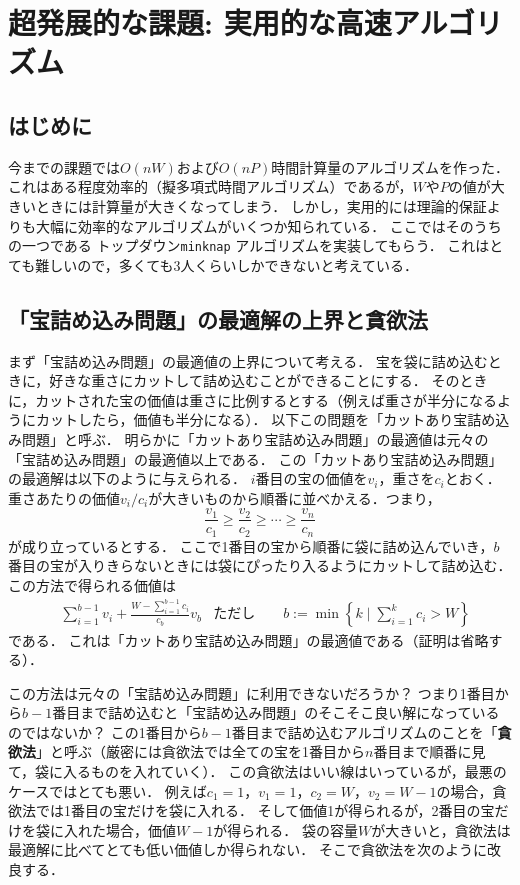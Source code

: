 \documentclass[a4paper,twoside,onecolumn,openany,article]{memoir}
\theoremstyle{remark}
\begin{document}
\section{超発展的な課題: 実用的な高速アルゴリズム}
\subsection{はじめに}
今までの課題では$O(nW)$および$O(nP)$時間計算量のアルゴリズムを作った．
これはある程度効率的（擬多項式時間アルゴリズム）であるが，$W$や$P$の値が大きいときには計算量が大きくなってしまう．
しかし，実用的には理論的保証よりも大幅に効率的なアルゴリズムがいくつか知られている．
ここではそのうちの一つである トップダウン\texttt{minknap} アルゴリズムを実装してもらう．
これはとても難しいので，多くても3人くらいしかできないと考えている．

\subsection{「宝詰め込み問題」の最適解の上界と貪欲法}
まず「宝詰め込み問題」の最適値の上界について考える．
宝を袋に詰め込むときに，好きな重さにカットして詰め込むことができることにする．
そのときに，カットされた宝の価値は重さに比例するとする（例えば重さが半分になるようにカットしたら，価値も半分になる）．
以下この問題を「カットあり宝詰め込み問題」と呼ぶ．
明らかに「カットあり宝詰め込み問題」の最適値は元々の「宝詰め込み問題」の最適値以上である．
この「カットあり宝詰め込み問題」の最適解は以下のように与えられる．
$i$番目の宝の価値を$v_i$，重さを$c_i$とおく．
重さあたりの価値$v_i/c_i$が大きいものから順番に並べかえる．つまり，
\begin{equation*}
\frac{v_1}{c_1}\ge
\frac{v_2}{c_2}\ge
\dotsb
\ge \frac{v_n}{c_n}
\end{equation*}
が成り立っているとする．
ここで1番目の宝から順番に袋に詰め込んでいき，$b$番目の宝が入りきらないときには袋にぴったり入るようにカットして詰め込む．
この方法で得られる価値は
\begin{align*}
&\sum_{i=1}^{b-1} v_i + \frac{W-\sum_{i=1}^{b-1} c_i}{c_b}v_b&
\text{ただし}\qquad b:= \min\left\{k\mid \sum_{i=1}^k c_i > W\right\}
\end{align*}
である．
これは「カットあり宝詰め込み問題」の最適値である（証明は省略する）．

この方法は元々の「宝詰め込み問題」に利用できないだろうか？
つまり1番目から$b-1$番目まで詰め込むと「宝詰め込み問題」のそこそこ良い解になっているのではないか？
この1番目から$b-1$番目まで詰め込むアルゴリズムのことを「\textbf{貪欲法}」と呼ぶ（厳密には貪欲法では全ての宝を1番目から$n$番目まで順番に見て，袋に入るものを入れていく）．
この貪欲法はいい線はいっているが，最悪のケースではとても悪い．
例えば$c_1=1$，$v_1=1$，$c_2=W$，$v_2=W-1$の場合，貪欲法では1番目の宝だけを袋に入れる．
そして価値1が得られるが，2番目の宝だけを袋に入れた場合，価値$W-1$が得られる．
袋の容量$W$が大きいと，貪欲法は最適解に比べてとても低い価値しか得られない．
そこで貪欲法を次のように改良する．
\end{document}
